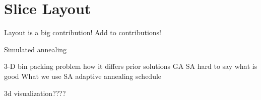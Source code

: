 \section{Slice Layout}
Layout is a big contribution!
Add to contributions!

Simulated annealing

3-D bin packing problem 
	how it differs
prior solutions
	GA
	SA
	hard to say what is good
What we use
	SA
	adaptive annealing schedule 
	
3d visualization????